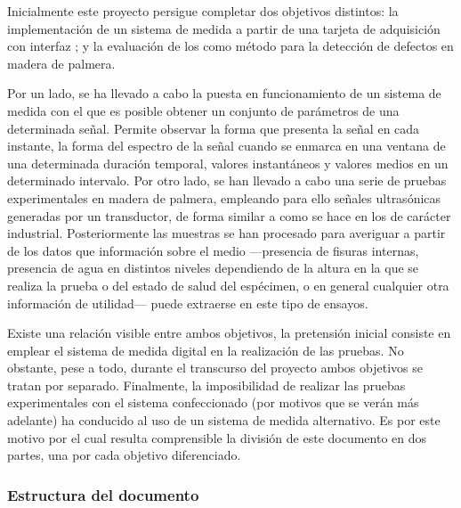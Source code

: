 Inicialmente este proyecto persigue completar dos objetivos distintos: la implementación de un sistema de medida a partir de una tarjeta de adquisición con interfaz ; y la evaluación de los  como método para la detección de defectos en madera de palmera.\par
Por un lado, se ha llevado a cabo la puesta en funcionamiento de un sistema de medida con el que es posible obtener un conjunto de parámetros de una determinada señal. Permite observar la forma que presenta la señal en cada instante, la forma del espectro de la señal cuando se enmarca en una ventana de una determinada duración temporal, valores instantáneos y valores medios en un determinado intervalo. Por otro lado, se han llevado a cabo una serie de pruebas experimentales en madera de palmera, empleando para ello señales ultrasónicas generadas por un transductor, de forma similar a como se hace en los  de carácter industrial. Posteriormente las muestras se han procesado para averiguar a partir de los datos que información sobre el medio ---presencia de fisuras internas, presencia de agua en distintos niveles dependiendo de la altura en la que se realiza la prueba o del estado de salud del espécimen, o en general cualquier otra información de utilidad--- puede extraerse en este tipo de ensayos.\par
Existe una relación visible entre ambos objetivos, la pretensión inicial consiste en emplear el sistema de medida digital en la realización de las pruebas. No obstante, pese a todo, durante el transcurso del proyecto ambos objetivos se tratan por separado. Finalmente, la imposibilidad de realizar las pruebas experimentales con el sistema confeccionado (por motivos que se verán más adelante) ha conducido al uso de un sistema de medida alternativo. Es por este motivo por el cual resulta comprensible la división de este documento en dos partes, una por cada objetivo diferenciado.


\subsubsection{Estructura del documento}

